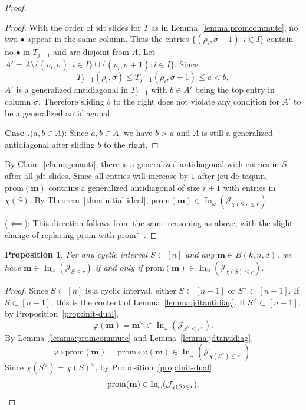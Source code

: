 \documentclass[12pt,reqno]{amsart}
\newtheorem{prop}[lemma]{Proposition}
\theoremstyle{definition}
\newcommand{\inn}{\operatorname{In}}
\newcommand{\RNum}[1]{\uppercase\expandafter{\romannumeral #1\relax}}
\newcommand{\mm}{\mathbf m}
\newcommand{\cJ}{\mathcal{J}}
\begin{document}
{\begin{proof}
\begin{proof}
    With the order of jdt slides for $T$ as in Lemma~\ref{lemma:promcommute}, no two $\bullet$ appear in the same column. Thus the entries $\{(\rho_i,\sigma+1):i\in I\}$ contain no $\bullet$ in $T_{j-1}$ and are disjoint from $A$. Let $A' = A\setminus \{(\rho_i,\sigma):i\in I\} \cup \{(\rho_i,\sigma+1):i\in I\}$. 
    Since 
    \[T_{j-1}(\rho_i,\sigma)\leq T_{j-1}(\rho_i,\sigma+1) \leq a < b,\]
    $A'$ is a generalized antidiagonal in $T_{j-1}$ with $b\in A'$ being the top entry in column $\sigma$. Therefore sliding $b$ to the right does not violate any condition for $A'$ to be a generalized antidiagonal. 
    
    \noindent\textbf{Case \RNum{4}.}($a,b\in A$): Since $a,b\in A$, we have $b>a$ and $A$ is still a generalized antidiagonal after sliding $b$ to the right.
    \end{proof}
    
    By Claim~\ref{claim:genanti}, there is a generalized antidiagonal with entries in $S$ after all jdt slides.
    Since all entries will increase by $1$ after jeu de taquin, $\mathrm{prom}(\mm)$ contains a generalized antidiagonal of size $r+1$ with entries in $\chi(S)$. By Theorem~\ref{thm:initial-ideal}, $\mathrm{prom}(\mm) \in \inn_\omega(\cJ_{\chi(S)\leq r})$.

    ($\impliedby$): This direction follows from the same reasoning as above, with the slight change of replacing $\mathrm{prom}$ with $\mathrm{prom}^{-1}$.
\end{proof}

\begin{prop}\label{prop:basicprom}
    For any cyclic interval $S\subset [n]$ and any $\mm\in B(k,n,d)$, we have $\mm\in \inn_\omega(\cJ_{S\leq r})$ if and only if $\mathrm{prom}(\mm) \in \inn_\omega(\cJ_{\chi(S)\leq r})$.
\end{prop}
\begin{proof}
    Since $S\subset [n]$ is a cyclic interval, either $S\subset [n-1]$ or $S^\vee \subset [n-1]$. If $S\subset[n-1]$, this is the content of Lemma~\ref{lemma:jdtantidiag}. If $S^\vee \subset [n-1]$, by Proposition~\ref{prop:init-dual}, 
    \[\varphi(\mm) = \mm^\vee\in \inn_\omega(\cJ_{S^\vee\leq r^\vee}).\]
    By Lemma~\ref{lemma:promcommute} and Lemma~\ref{lemma:jdtantidiag}, 
    \[\varphi\circ \mathrm{prom}(\mm) = \mathrm{prom}\circ \varphi(\mm) \in \inn_\omega(\cJ_{\chi(S^\vee)\leq r^\vee}).\]
    Since $\chi(S^\vee) = \chi(S)^\vee$, by Proposition~\ref{prop:init-dual}, 
    \[\mathrm{prom}(\mm)\in  \inn_\omega(\cJ_{\chi(S)\leq r}).\qedhere\]
\end{proof}

}
\end{document}
